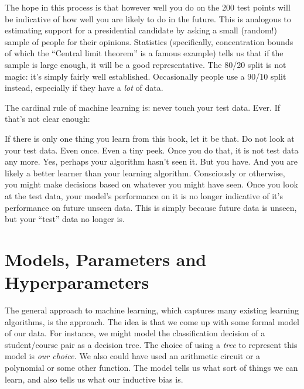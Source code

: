 The hope in this process is that however well you do on the $200$ test
points will be indicative of how well you are likely to do in the
future.  This is analogous to estimating support for a presidential
candidate by asking a small (random!) sample of people for their
opinions.  Statistics (specifically, concentration bounds of which the
``Central limit theorem'' is a famous example) tells us that if the
sample is large enough, it will be a good representative.  The 80/20
split is not magic: it's simply fairly well established.  Occasionally
people use a 90/10 split instead, especially if they have a \emph{lot}
of data.


The cardinal rule of machine learning is: never touch your test data.
Ever.  If that's not clear enough:

\noindent
{}

If there is only one thing you learn from this book, let it be that.
Do not look at your test data.  Even once.  Even a tiny peek.  Once
you do that, it is not test data any more.  Yes, perhaps your
algorithm hasn't seen it.  But you have.  And you are likely a better
learner than your learning algorithm.  Consciously or otherwise, you
might make decisions based on whatever you might have seen.  Once you
look at the test data, your model's performance on it is no longer
indicative of it's performance on future unseen data.  This is simply
because future data is unseen, but your ``test'' data no longer is.

\section{Models, Parameters and Hyperparameters}

The general approach to machine learning, which captures many existing
learning algorithms, is the  approach.  The idea is
that we come up with some formal model of our data.  For instance, we
might model the classification decision of a student/course pair as a
decision tree.  The choice of using a \emph{tree} to represent this
model is \emph{our choice.}  We also could have used an arithmetic
circuit or a polynomial or some other function.  The model tells us
what sort of things we can learn, and also tells us what our inductive
bias is.

